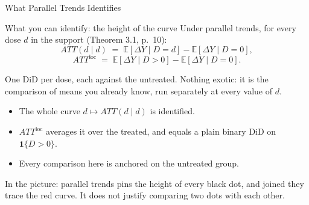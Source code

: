 \documentclass[main.tex]{subfiles}
\begin{document}
\begin{frame}{What Parallel Trends Identifies}

  \begin{block}{What you can identify: the height of the curve}
    Under parallel trends, for every dose $d$ in the support (Theorem 3.1, p.~10):
    \[
      ATT(d\mid d) \;=\; \mathbb{E}\!\left[\Delta Y \mid D=d\right]
        - \mathbb{E}\!\left[\Delta Y \mid D=0\right],
    \]
    \[
      ATT^{\text{loc}} \;=\; \mathbb{E}\!\left[\Delta Y \mid D>0\right]
        - \mathbb{E}\!\left[\Delta Y \mid D=0\right].
    \]
  \end{block}

  \medskip
  One DiD per dose, each against the untreated. Nothing exotic: it is the
  comparison of means you already know, run separately at every value of $d$.

  \medskip
  \begin{itemize}
    \item The whole curve $d \mapsto ATT(d\mid d)$ is identified.
    \item $ATT^{\text{loc}}$ averages it over the treated, and equals a plain
      binary DiD on $\mathbf{1}\{D>0\}$.
    \item Every comparison here is anchored on the untreated group.
  \end{itemize}

  \medskip
  In the picture: parallel trends pins the height of every black dot, and joined
  they trace the red curve. It does not justify comparing two dots with each
  other.

\end{frame}
\end{document}
